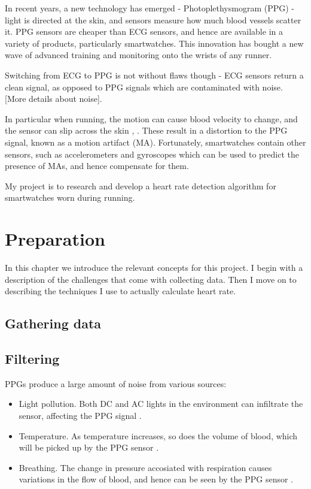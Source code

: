 \documentclass[12pt,a4paper,twoside,openright]{report}
\begin{document}
In recent years, a new technology has emerged - Photoplethysmogram (PPG) 
- light is directed at the skin, and sensors measure how much blood vessels
scatter it. PPG sensors are cheaper than ECG sensors, and hence are 
available in a variety of products, particularly smartwatches. This 
innovation has bought a new wave of advanced training and monitoring onto
the wrists of any runner.

Switching from ECG to PPG is not without flaws though - ECG sensors return a
clean signal, as opposed to PPG signals which are contaminated with
noise. [More details about noise]. 

In particular when running, the motion can cause blood velocity to 
change, and the sensor can slip across the skin \cite{Wijshoff17}, 
\cite{Wood06}. These result in a distortion to the PPG signal, known as a
motion artifact (MA). Fortunately, smartwatches contain other sensors, such
as accelerometers and gyroscopes which can be used to predict the presence of 
MAs, and hence compensate for them.

My project is to research and develop a heart rate detection algorithm
for smartwatches worn during running. 

\chapter{Preparation}

In this chapter we introduce the relevant concepts for this project. I begin
with a description of the challenges that come with collecting data. Then I
move on to describing the techniques I use to actually calculate heart rate.

\section{Gathering data}


\section{Filtering}

PPGs produce a large amount of noise from various sources:
\begin{itemize}
	\item Light pollution. Both DC and AC lights in the environment can
		infiltrate the sensor, affecting the PPG signal \cite{kim15}.
	\item Temperature. As temperature increases, so does the volume of
		blood, which will be picked up by the PPG sensor 
		\cite{shin16}.
	\item Breathing. The change in pressure accosiated with respiration
		causes variations in the flow of blood, and hence can be seen
		by the PPG sensor \cite{allen02}.
\end{itemize}
\end{document}

